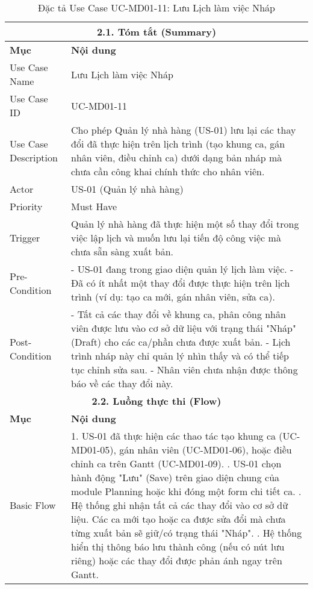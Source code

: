 \begin{longtable}{|m{4cm}|p{11cm}|}
\caption{Đặc tả Use Case UC-MD01-11: Lưu Lịch làm việc Nháp} \label{tab:uc_md01_11_revised} \\
\hline
\multicolumn{2}{|c|}{\textbf{2.1. Tóm tắt (Summary)}} \\
\hline
\textbf{Mục} & \textbf{Nội dung} \\
\hline
\endhead %
\hline
\endfoot %
\hline
\endlastfoot %
Use Case Name & Lưu Lịch làm việc Nháp \\
\hline
Use Case ID & UC-MD01-11 \\
\hline
Use Case Description & Cho phép Quản lý nhà hàng (US-01) lưu lại các thay đổi đã thực hiện trên lịch trình (tạo khung ca, gán nhân viên, điều chỉnh ca) dưới dạng bản nháp mà chưa cần công khai chính thức cho nhân viên. \\
\hline
Actor & US-01 (Quản lý nhà hàng) \\
\hline
Priority & Must Have \\
\hline
Trigger & Quản lý nhà hàng đã thực hiện một số thay đổi trong việc lập lịch và muốn lưu lại tiến độ công việc mà chưa sẵn sàng xuất bản. \\
\hline
Pre-Condition & - US-01 đang trong giao diện quản lý lịch làm việc. \newline - Đã có ít nhất một thay đổi được thực hiện trên lịch trình (ví dụ: tạo ca mới, gán nhân viên, sửa ca). \\
\hline
Post-Condition & - Tất cả các thay đổi về khung ca, phân công nhân viên được lưu vào cơ sở dữ liệu với trạng thái "Nháp" (Draft) cho các ca/phần chưa được xuất bản. \newline - Lịch trình nháp này chỉ quản lý nhìn thấy và có thể tiếp tục chỉnh sửa sau. \newline - Nhân viên chưa nhận được thông báo về các thay đổi này. \\
\hline
\multicolumn{2}{|c|}{\textbf{2.2. Luồng thực thi (Flow)}} \\
\hline
\textbf{Mục} & \textbf{Nội dung} \\
\hline
Basic Flow & 1. US-01 đã thực hiện các thao tác tạo khung ca (UC-MD01-05), gán nhân viên (UC-MD01-06), hoặc điều chỉnh ca trên Gantt (UC-MD01-09). \newline 2. US-01 chọn hành động "Lưu" (Save) trên giao diện chung của module Planning hoặc khi đóng một form chi tiết ca.
\newline 3. Hệ thống ghi nhận tất cả các thay đổi vào cơ sở dữ liệu. Các ca mới tạo hoặc ca được sửa đổi mà chưa từng xuất bản sẽ giữ/có trạng thái "Nháp". \newline 4. Hệ thống hiển thị thông báo lưu thành công (nếu có nút lưu riêng) hoặc các thay đổi được phản ánh ngay trên Gantt. \\

\end{longtable}
